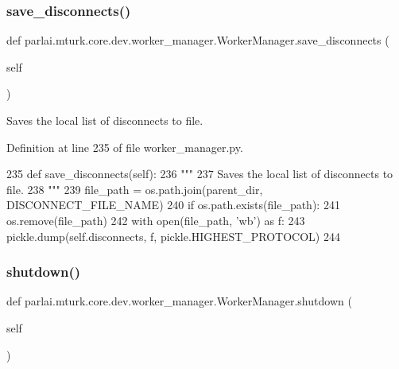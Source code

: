 \subsubsection{\texorpdfstring{save\+\_\+disconnects()}{save\_disconnects()}}
{\footnotesize\ttfamily def parlai.\+mturk.\+core.\+dev.\+worker\+\_\+manager.\+Worker\+Manager.\+save\+\_\+disconnects (\begin{DoxyParamCaption}\item[{}]{self }\end{DoxyParamCaption})}

\begin{DoxyVerb}Saves the local list of disconnects to file.
\end{DoxyVerb}
 

Definition at line 235 of file worker\+\_\+manager.\+py.


\begin{DoxyCode}
235     \textcolor{keyword}{def }save\_disconnects(self):
236         \textcolor{stringliteral}{"""}
237 \textcolor{stringliteral}{        Saves the local list of disconnects to file.}
238 \textcolor{stringliteral}{        """}
239         file\_path = os.path.join(parent\_dir, DISCONNECT\_FILE\_NAME)
240         \textcolor{keywordflow}{if} os.path.exists(file\_path):
241             os.remove(file\_path)
242         with open(file\_path, \textcolor{stringliteral}{'wb'}) \textcolor{keyword}{as} f:
243             pickle.dump(self.disconnects, f, pickle.HIGHEST\_PROTOCOL)
244 
\end{DoxyCode}
\mbox{\label{classparlai_1_1mturk_1_1core_1_1dev_1_1worker__manager_1_1WorkerManager_af1fe1df324e27042479dbc71d6565e57}} 
\subsubsection{\texorpdfstring{shutdown()}{shutdown()}}
{\footnotesize\ttfamily def parlai.\+mturk.\+core.\+dev.\+worker\+\_\+manager.\+Worker\+Manager.\+shutdown (\begin{DoxyParamCaption}\item[{}]{self }\end{DoxyParamCaption})}

